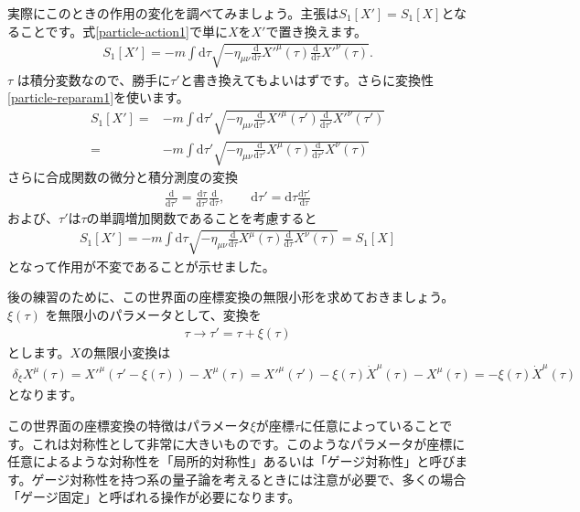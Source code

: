 \documentclass[report,paper=a4, fontsize=12pt, line_length=16cm, number_of_lines=33,dvipdfmx]{jlreq}
\numberwithin{equation}{chapter}
\numberwithin{equation}{section}
\newcommand{\di}{\mathrm{d}}
\begin{document}
実際にこのときの作用の変化を調べてみましょう。主張は$S_{1}[X']=S_{1}[X]$となることです。式\eqref{particle-action1}で単に$X$を$X'$で置き換えます。
\begin{align}
 S_{1}[X']=-m\int \di \tau \sqrt{-\eta_{\mu\nu}\frac{\di}{\di\tau}X'^{\mu}(\tau) \frac{\di}{\di\tau}X'^{\nu}(\tau)}.
\end{align}
$\tau$ は積分変数なので、勝手に$\tau'$と書き換えてもよいはずです。さらに変換性\eqref{particle-reparam1}を使います。
\begin{align}
 S_{1}[X']
=&-m\int \di \tau' \sqrt{-\eta_{\mu\nu}\frac{\di}{\di\tau'}X'^{\mu}(\tau') \frac{\di}{\di\tau'}X'^{\nu}(\tau')}\\
=&-m\int \di \tau' \sqrt{-\eta_{\mu\nu}\frac{\di}{\di\tau'}X^{\mu}(\tau) \frac{\di}{\di\tau'}X^{\nu}(\tau)}
\end{align}
さらに合成関数の微分と積分測度の変換
\begin{align}
 \frac{\di}{\di \tau'}=\frac{\di \tau}{\di \tau'}\frac{\di}{\di\tau},\qquad \di \tau'=\di \tau\frac{\di \tau'}{\di \tau}
\end{align}
および、$\tau'$は$\tau$の単調増加関数であることを考慮すると
\begin{align}
 S_{1}[X']
=-m\int \di\tau \sqrt{-\eta_{\mu\nu}\frac{\di}{\di\tau}X^{\mu}(\tau) \frac{\di}{\di\tau}X^{\nu}(\tau)}
=S_{1}[X]
\end{align}
となって作用が不変であることが示せました。



後の練習のために、この世界面の座標変換の無限小形を求めておきましょう。
$\xi(\tau)$ を無限小のパラメータとして、変換を
\begin{align}
 \tau \to \tau'=\tau+\xi(\tau)
\end{align}
とします。$X$の無限小変換は
\begin{align}
 \delta_{\xi} X^{\mu}(\tau)
=X'^{\mu}(\tau'-\xi(\tau))-X^{\mu}(\tau)
=X'^{\mu}(\tau')-\xi(\tau) \dot{X}^{\mu}(\tau)-X^{\mu}(\tau)
=-\xi(\tau) \dot{X}^{\mu}(\tau)
\end{align}
となります。

この世界面の座標変換の特徴はパラメータ$\xi$が座標$\tau$に任意によっていることです。これは対称性として非常に大きいものです。このようなパラメータが座標に任意によるような対称性を「局所的対称性」あるいは「ゲージ対称性」と呼びます。ゲージ対称性を持つ系の量子論を考えるときには注意が必要で、多くの場合「ゲージ固定」と呼ばれる操作が必要になります。
\end{document}
